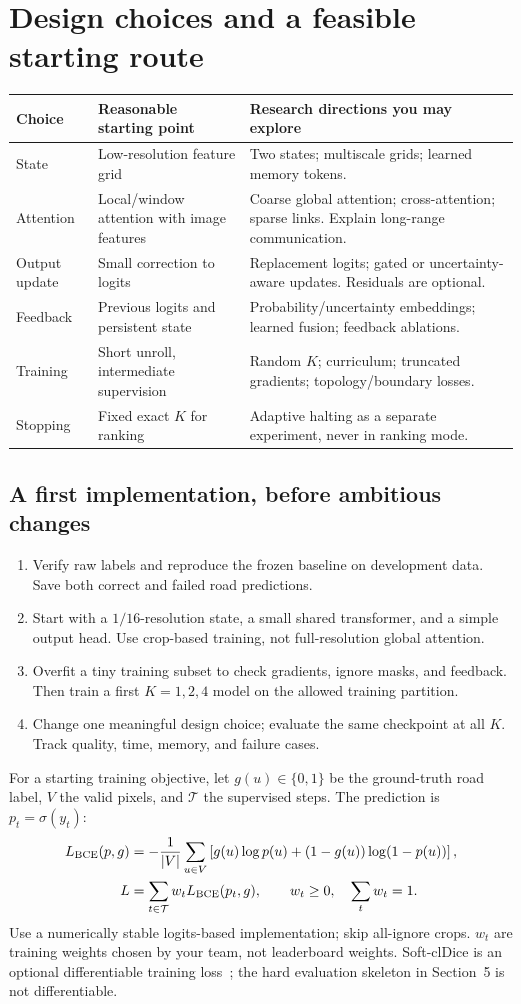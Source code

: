 \documentclass[11pt,letterpaper]{article}
\newcommand{\page}[1]{\clearpage\section{#1}}
\begin{document}
\page{Design choices and a feasible starting route}
\small
\renewcommand{\arraystretch}{1.1}
\begin{tabularx}{\linewidth}{@{}>{\raggedright\arraybackslash}p{1.10in}YY@{}}
\toprule
Choice & Reasonable starting point & Research directions you may explore\\\midrule
State & Low-resolution feature grid & Two states; multiscale grids; learned memory tokens.\\
Attention & Local/window attention with image features & Coarse global attention; cross-attention; sparse links. Explain long-range communication.\\
Output update & Small correction to logits & Replacement logits; gated or uncertainty-aware updates. Residuals are optional.\\
Feedback & Previous logits and persistent state & Probability/uncertainty embeddings; learned fusion; feedback ablations.\\
Training & Short unroll, intermediate supervision & Random $K$; curriculum; truncated gradients; topology/boundary losses.\\
Stopping & Fixed exact $K$ for ranking & Adaptive halting as a separate experiment, never in ranking mode.\\
\bottomrule
\end{tabularx}
\normalsize

\subsection{A first implementation, before ambitious changes}
\begin{enumerate}
\item Verify raw labels and reproduce the frozen baseline on development data. Save both correct and failed road predictions.
\item Start with a $1/16$-resolution state, a small shared transformer, and a simple output head. Use crop-based training, not full-resolution global attention.
\item Overfit a tiny training subset to check gradients, ignore masks, and feedback. Then train a first $K=1,2,4$ model on the allowed training partition.
\item Change one meaningful design choice; evaluate the same checkpoint at all $K$. Track quality, time, memory, and failure cases.
\end{enumerate}

For a starting training objective, let $g(u)\in\{0,1\}$ be the ground-truth road label, $V$ the valid pixels, and $\mathcal T$ the supervised steps. The prediction is $p_t=\sigma(y_t)$:
\begin{align}
 L_{\rm BCE}(p,g)&=-\frac{1}{|V|}\sum_{u\in V}\left[g(u)\log p(u)+(1-g(u))\log(1-p(u))\right],\\
 L&=\sum_{t\in\mathcal T}w_t L_{\rm BCE}(p_t,g),\qquad w_t\geq0,\quad\sum_t w_t=1.
\end{align}
Use a numerically stable logits-based implementation; skip all-ignore crops. $w_t$ are training weights chosen by your team, not leaderboard weights. Soft-clDice is an optional differentiable training loss~\cite{cldice}; the hard evaluation skeleton in Section~5 is not differentiable.
\end{document}
